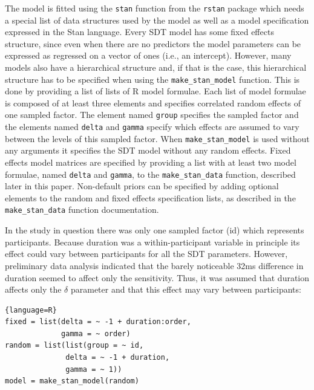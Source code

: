 \documentclass[oneside,a4paper]{article}
\begin{document}
The model is fitted using the \texttt{stan} function from the
\texttt{rstan} package which needs a special list of data structures
used by the model as well as a model specification expressed in the
Stan language. Every SDT model has some fixed effects structure, since
even when there are no predictors the model parameters can be
expressed as regressed on a vector of ones (i.e., an
intercept). However, many models also have a hierarchical structure
and, if that is the case, this hierarchical structure has to be
specified when using the \texttt{make\_stan\_model} function. This is
done by providing a list of lists of R model formulae. Each list of
model formulae is composed of at least three elements and specifies
correlated random effects of one sampled factor. The element named
\texttt{group} specifies the sampled factor and the elements named
\texttt{delta} and \texttt{gamma} specify which effects are assumed to
vary between the levels of this sampled factor. When
\texttt{make\_stan\_model} is used without any arguments it specifies
the SDT model without any random effects. Fixed effects model matrices
are specified by providing a list with at least two model formulae,
named \texttt{delta} and \texttt{gamma}, to the
\texttt{make\_stan\_data} function, described later in this
paper. Non-default priors can be specified by adding optional elements
to the random and fixed effects specification lists, as described in
the \texttt{make\_stan\_data} function documentation.

In the study in question there was only one sampled factor (id) which
represents participants. Because duration was a within-participant
variable in principle its effect could vary between participants for
all the SDT parameters. However, preliminary data analysis indicated
that the barely noticeable 32ms difference in duration seemed to
affect only the sensitivity. Thus, it was assumed that duration
affects only the $\delta$ parameter and that this effect may vary
between participants:

\begin{lstlisting}{language=R}
fixed = list(delta = ~ -1 + duration:order, 
             gamma = ~ order)
random = list(list(group = ~ id, 
              delta = ~ -1 + duration, 
              gamma = ~ 1))
model = make_stan_model(random)
\end{lstlisting}
\end{document}
